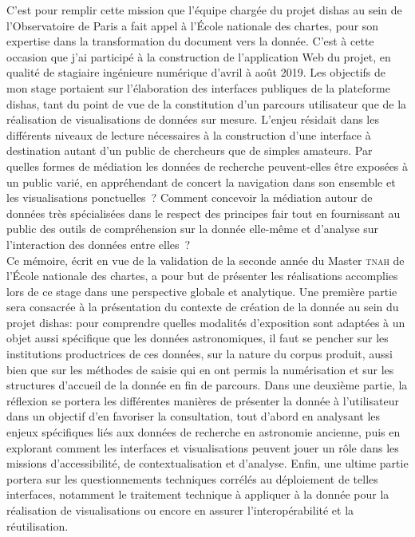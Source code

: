 \documentclass[a4paper,12pt,twoside]{book}
\newcommand{\enc}{École nationale des chartes\xspace}
\newcommand{\tnah}{\textsc{tnah}\xspace}
\newcommand{\dishas}{\gls{dishas}\xspace}
\newcommand{\fair}{\gls{fair}\xspace}
\begin{document}
C'est pour remplir cette mission que l'équipe chargée du projet \dishas au sein de l'Observatoire de Paris a fait appel à l'\enc, pour son expertise dans la transformation du document vers la donnée. C'est à cette occasion que j'ai participé à la construction de l'application Web du projet, en qualité de stagiaire ingénieure numérique d’avril à août 2019. Les objectifs de mon stage portaient sur l'élaboration des interfaces publiques de la plateforme \dishas, tant du point de vue de la constitution d'un parcours utilisateur que de la réalisation de visualisations de données sur mesure. L'enjeu résidait dans les différents niveaux de lecture nécessaires à la construction d'une interface à destination autant d'un public de chercheurs que de simples amateurs. Par quelles formes de médiation les données de recherche peuvent-elles être exposées à un public varié, en appréhendant de concert la navigation dans son ensemble et les visualisations ponctuelles~? Comment concevoir la médiation autour de données très spécialisées dans le respect des principes \fair tout en fournissant au public des outils de compréhension sur la donnée elle-même et d'analyse sur l'interaction des données entre elles~?\\

Ce mémoire, écrit en vue de la validation de la seconde année du Master \tnah de l’\enc, a pour but de présenter les réalisations accomplies lors de ce stage dans une perspective globale et analytique. Une première partie sera consacrée à la présentation du contexte de création de la donnée au sein du projet \dishas: pour comprendre quelles modalités d'exposition sont adaptées à un objet aussi spécifique que les données astronomiques, il faut se pencher sur les institutions productrices de ces données, sur la nature du corpus produit, aussi bien que sur les méthodes de saisie qui en ont permis la numérisation et sur les structures d'accueil de la donnée en fin de parcours. Dans une deuxième partie, la réflexion se portera les différentes manières de présenter la donnée à l'utilisateur dans un objectif d'en favoriser la consultation, tout d'abord en analysant les enjeux spécifiques liés aux données de recherche en astronomie ancienne, puis en explorant comment les interfaces et visualisations peuvent jouer un rôle dans les missions d'accessibilité, de contextualisation et d'analyse. Enfin, une ultime partie portera sur les questionnements techniques corrélés au déploiement de telles interfaces, notamment le traitement technique à appliquer à la donnée pour la réalisation de visualisations ou encore en assurer l'interopérabilité et la réutilisation.\\
	
\end{document}
